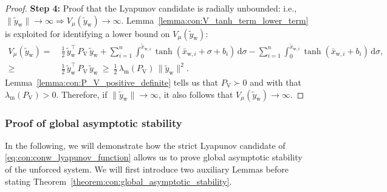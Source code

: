 \begin{proof}
    \textbf{Step 4:} Proof that the Lyapunov candidate is radially unbounded: i.e., $\lVert \tilde{y}_\mathrm{w} \rVert \rightarrow \infty \Rightarrow V_\mu(\tilde{y}_\mathrm{w}) \rightarrow \infty$. Lemma~\ref{lemma:con:V_tanh_term_lower_term} is exploited for identifying a lower bound on $V_\mu(\tilde{y}_\mathrm{w})$:
    \begin{equation}
    \begin{split}
        V_\mu(\tilde{y}_\mathrm{w}) =& \: \frac{1}{2} \, \tilde{y}_\mathrm{w}^\top \, P_\mathrm{V} \, \tilde{y}_\mathrm{w} + \sum_{i=1}^n \int_{0}^{\tilde{x}_{\mathrm{w},i}} \tanh(\bar{x}_{\mathrm{w},i}+\sigma+b_i) \, \mathrm{d} \sigma - \sum_{i=1}^n \int_{0}^{\tilde{x}_{\mathrm{w},i}} \tanh(\bar{x}_{\mathrm{w},i}+b_i) \, \mathrm{d} \sigma,\\
        \geq& \: \frac{1}{2} \, \tilde{y}_\mathrm{w}^\top \, P_\mathrm{V} \, \tilde{y}_\mathrm{w} \: \geq \: \frac{1}{2} \, \lambda_\mathrm{m}(P_\mathrm{V}) \, \lVert \tilde{y}_\mathrm{w} \rVert^2.
    \end{split}
    \end{equation}
    Lemma~\ref{lemma:con:P_V_positive_definite} tells us that $P_\mathrm{V} \succ 0$ and with that $\lambda_\mathrm{m}(P_\mathrm{V}) > 0$. Therefore, if $\lVert \tilde{y}_\mathrm{w} \rVert \rightarrow \infty$, it also follows that $V_\mu(\tilde{y}_\mathrm{w}) \rightarrow \infty$.
\end{proof}

\subsubsection{Proof of global asymptotic stability}

In the following, we will demonstrate how the strict Lyapunov candidate of \eqref{eq:con:conw_lyapunov_function} allows us to prove global asymptotic stability of the unforced system. We will first introduce two auxiliary Lemmas before stating Theorem~\ref{theorem:con:global_asymptotic_stability}.

